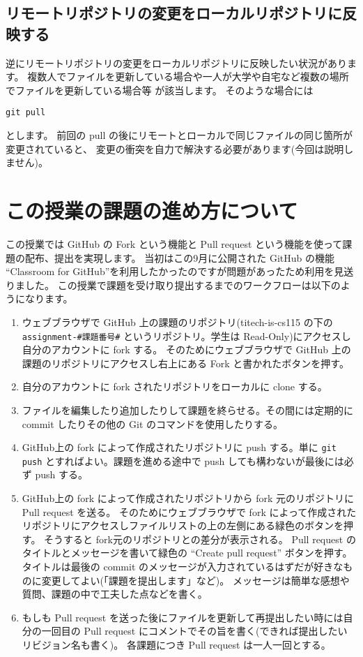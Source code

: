 \documentclass[a4paper]{article}
\begin{document}
\subsection{リモートリポジトリの変更をローカルリポジトリに反映する}
逆にリモートリポジトリの変更をローカルリポジトリに反映したい状況があります。
複数人でファイルを更新している場合や一人が大学や自宅など複数の場所でファイルを更新している場合等
が該当します。
そのような場合には
\begin{verbatim}
git pull
\end{verbatim}
とします。
前回の pull の後にリモートとローカルで同じファイルの同じ箇所が変更されていると、
変更の衝突を自力で解決する必要があります(今回は説明しません)。

\section{この授業の課題の進め方について}
この授業では GitHub の Fork という機能と Pull request という機能を使って課題の配布、提出を実現します。
当初はこの9月に公開された GitHub の機能 ``Classroom for GitHub''を利用したかったのですが問題があったため利用を見送りました。
この授業で課題を受け取り提出するまでのワークフローは以下のようになります。
\begin{enumerate}
\item ウェブブラウザで GitHub 上の課題のリポジトリ(titech-is-cs115 の下の \verb|assignment-#課題番号#| というリポジトリ。学生は Read-Only)にアクセスし自分のアカウントに fork する。
そのためにウェブブラウザで GitHub 上の課題のリポジトリにアクセスし右上にある Fork と書かれたボタンを押す。
\item 自分のアカウントに fork されたリポジトリをローカルに clone する。
\item ファイルを編集したり追加したりして課題を終らせる。その間には定期的に commit したりその他の Git のコマンドを使用したりする。
\item GitHub上の fork によって作成されたリポジトリに push する。単に \texttt{git push} とすればよい。課題を進める途中で push しても構わないが最後には必ず push する。
\item GitHub上の fork によって作成されたリポジトリから fork 元のリポジトリに Pull request を送る。
そのためにウェブブラウザで fork によって作成されたリポジトリにアクセスしファイルリストの上の左側にある緑色のボタンを押す。
そうすると fork元のリポジトリとの差分が表示される。
Pull request のタイトルとメッセージを書いて緑色の ``Create pull request'' ボタンを押す。
タイトルは最後の commit のメッセージが入力されているはずだが好きなものに変更してよい(「課題を提出します」など)。
メッセージは簡単な感想や質問、課題の中で工夫した点などを書く。
\item もしも Pull request を送った後にファイルを更新して再提出したい時には自分の一回目の Pull request にコメントでその旨を書く(できれば提出したいリビジョン名も書く)。
各課題につき Pull request は一人一回とする。
\end{enumerate}
\end{document}
